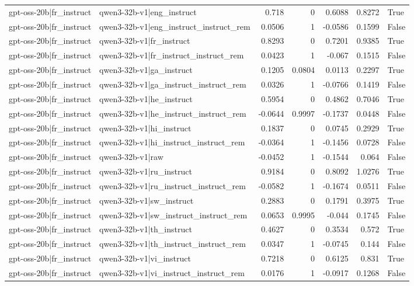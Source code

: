 \begin{table}
\begin{tabular}{l l r r r r l}
gpt-oss-20b|fr_instruct & qwen3-32b-v1|eng_instruct & 0.718 & 0 & 0.6088 & 0.8272 & True \\
gpt-oss-20b|fr_instruct & qwen3-32b-v1|eng_instruct_instruct_rem & 0.0506 & 1 & -0.0586 & 0.1599 & False \\
gpt-oss-20b|fr_instruct & qwen3-32b-v1|fr_instruct & 0.8293 & 0 & 0.7201 & 0.9385 & True \\
gpt-oss-20b|fr_instruct & qwen3-32b-v1|fr_instruct_instruct_rem & 0.0423 & 1 & -0.067 & 0.1515 & False \\
gpt-oss-20b|fr_instruct & qwen3-32b-v1|ga_instruct & 0.1205 & 0.0804 & 0.0113 & 0.2297 & True \\
gpt-oss-20b|fr_instruct & qwen3-32b-v1|ga_instruct_instruct_rem & 0.0326 & 1 & -0.0766 & 0.1419 & False \\
gpt-oss-20b|fr_instruct & qwen3-32b-v1|he_instruct & 0.5954 & 0 & 0.4862 & 0.7046 & True \\
gpt-oss-20b|fr_instruct & qwen3-32b-v1|he_instruct_instruct_rem & -0.0644 & 0.9997 & -0.1737 & 0.0448 & False \\
gpt-oss-20b|fr_instruct & qwen3-32b-v1|hi_instruct & 0.1837 & 0 & 0.0745 & 0.2929 & True \\
gpt-oss-20b|fr_instruct & qwen3-32b-v1|hi_instruct_instruct_rem & -0.0364 & 1 & -0.1456 & 0.0728 & False \\
gpt-oss-20b|fr_instruct & qwen3-32b-v1|raw & -0.0452 & 1 & -0.1544 & 0.064 & False \\
gpt-oss-20b|fr_instruct & qwen3-32b-v1|ru_instruct & 0.9184 & 0 & 0.8092 & 1.0276 & True \\
gpt-oss-20b|fr_instruct & qwen3-32b-v1|ru_instruct_instruct_rem & -0.0582 & 1 & -0.1674 & 0.0511 & False \\
gpt-oss-20b|fr_instruct & qwen3-32b-v1|sw_instruct & 0.2883 & 0 & 0.1791 & 0.3975 & True \\
gpt-oss-20b|fr_instruct & qwen3-32b-v1|sw_instruct_instruct_rem & 0.0653 & 0.9995 & -0.044 & 0.1745 & False \\
gpt-oss-20b|fr_instruct & qwen3-32b-v1|th_instruct & 0.4627 & 0 & 0.3534 & 0.572 & True \\
gpt-oss-20b|fr_instruct & qwen3-32b-v1|th_instruct_instruct_rem & 0.0347 & 1 & -0.0745 & 0.144 & False \\
gpt-oss-20b|fr_instruct & qwen3-32b-v1|vi_instruct & 0.7218 & 0 & 0.6125 & 0.831 & True \\
gpt-oss-20b|fr_instruct & qwen3-32b-v1|vi_instruct_instruct_rem & 0.0176 & 1 & -0.0917 & 0.1268 & False \\

\end{tabular}
\end{table}

